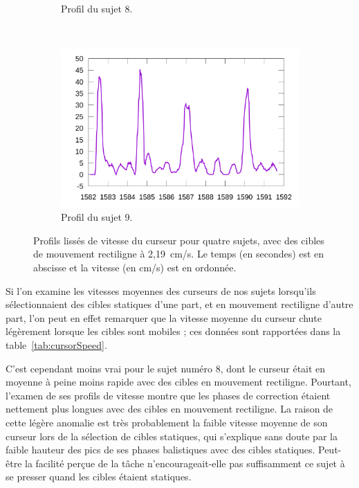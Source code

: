\begin{figure}[!htb]
\begin{subfigure}[t]{\subImgWlineplot}
			\caption{Profil du sujet 8.}
			\label{fig:rectProfile8}
		\end{subfigure}
		~
		\begin{subfigure}[t]{\subImgWlineplot}
			\centering
			\includegraphics[width=\textwidth]{figures/ch4/subject_09_rect_219_smoothed}
			\caption{Profil du sujet 9.}
			\label{fig:rectProfile9}
		\end{subfigure}
		\caption[Profils de vitesse du curseur, cibles de mouvement rectiligne]{Profils lissés de vitesse du curseur pour quatre sujets, avec des cibles de mouvement rectiligne à 2,19~cm/s. Le temps (en secondes) est en abscisse et la vitesse (en cm/s) est en ordonnée.}
		\label{fig:rectProfiles}
	\end{figure}
	
	Si l'on examine les vitesses moyennes des curseurs de nos sujets lorsqu'ils sélectionnaient des cibles statiques d'une part, et en mouvement rectiligne d'autre part, l'on peut en effet remarquer que la vitesse moyenne du curseur chute légèrement lorsque les cibles sont mobiles ; ces données sont rapportées dans la table~\ref{tab:cursorSpeed}.
	
	C'est cependant moins vrai pour le sujet numéro 8, dont le curseur était en moyenne à peine moins rapide avec des cibles en mouvement rectiligne. Pourtant, l'examen de ses profils de vitesse montre que les phases de correction étaient nettement plus longues avec des cibles en mouvement rectiligne. La raison de cette légère anomalie est très probablement la faible vitesse moyenne de son curseur lors de la sélection de cibles statiques, qui s'explique sans doute par la faible hauteur des \og pics \fg{} de ses phases balistiques avec des cibles statiques. Peut-être la facilité perçue de la tâche n'encourageait-elle pas suffisamment ce sujet à se presser quand les cibles étaient statiques.
	
